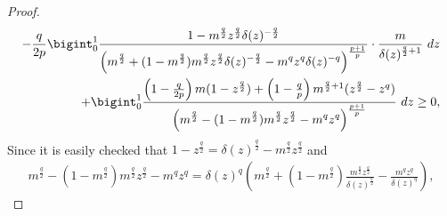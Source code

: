 \documentclass{amsart}
\theoremstyle{definition}
\theoremstyle{remark}
\begin{document}
\begin{proof}
\begin{equation*}
\begin{split}
-\frac q {2p}\bigint _{0}^1 \frac{ 1-m^{\frac q2}z^{\frac q2}\delta (z)^{-\frac q2}}{\displaystyle \left(m^\frac q2+(1-m^\frac q2)m^{\frac q2}z^{\frac q2}{\delta (z)^{-\frac q2}}- \displaystyle m^qz^q{\delta (z)^{-q}}\right)^\frac{p+1}{p}}\cdot\frac{m}{\displaystyle \delta(z)^{\frac q2+1}} \ dz\\
+ \bigint_{0}^1\frac{ \left(1 -\frac q{2p}\right)m(1-z^{\frac q2}) +\left(1-\frac{q}{p}\right)m^{\frac q2 +1}(z^{\frac q2}-z^q) }{\displaystyle \left(m^\frac q2-(1-m^\frac q2)m^{\frac q2}z^{\frac q2}-m^qz^q\right)^\frac{p +1}{p}} \ dz\ge 0,
\end{split}
\end{equation*}
Since it is easily checked that $1- z^\frac q 2=\delta (z)^\frac q2 -m^{\frac q2}z^{\frac q2}$ and 
\begin{multline*}
\displaystyle  m^\frac q2-(1-m^\frac q2)m^{\frac q2}z^{\frac q2}-m^qz^q   =
\delta(z)^q \left(m^\frac q2+(1-m^\frac q2)\frac{m^{\frac q2}z^{\frac q2}}{\delta (z)^{\frac q2}}- \frac{\displaystyle m^{q}z^q}{\delta (z)^q}\right),
\end{multline*}

\end{proof}
\end{document}
